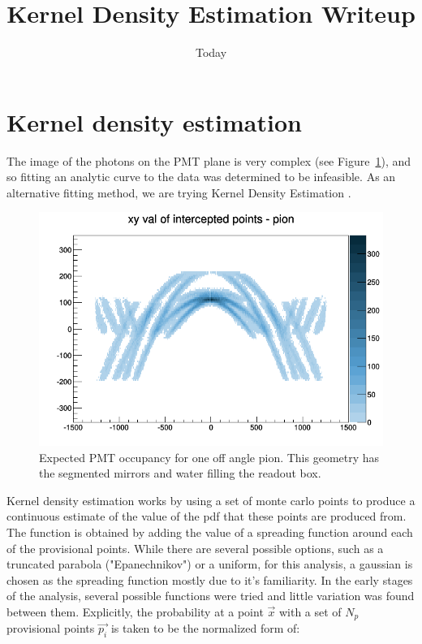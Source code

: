 \documentclass[11pt]{article}
\begin{document}
\title{Kernel Density Estimation Writeup}
\date{Today}
\maketitle

\section{Kernel density estimation}
The image of the photons on the PMT plane is very complex (see Figure~\ref{fig:distribution}), and so fitting an analytic curve to the data was determined to be infeasible.  As an alternative fitting method, we are trying Kernel Density Estimation \cite{rosenblatt1956}.
\begin{figure}
\centering
\caption{Expected PMT occupancy for one off angle pion.  This geometry has the segmented mirrors and water filling the readout box.\label{fig:distribution}}
\includegraphics[width=5in]{pngs/fitdirc_ang440_3seg_index_5000MeV_133_pion_dist.png}
\end{figure}
Kernel density estimation works by using a set of monte carlo points to produce a continuous estimate of the value of the pdf that these points are produced from.  The function is obtained by adding the value of a spreading function around each of the provisional points.  While there are several possible options, such as a truncated parabola ("Epanechnikov") or a uniform, for this analysis, a gaussian is chosen as the spreading function mostly due to it's familiarity.  In the early stages of the analysis, several possible functions were tried and little variation was found between them.  Explicitly, the probability at a point $\vec{x}$ with a set of $N_p$ provisional points $\vec{p_i}$ is taken to be the normalized form of:
\end{document}
